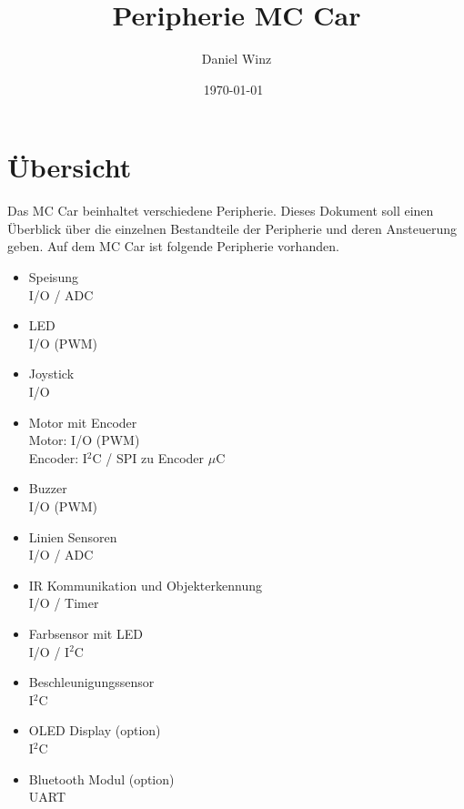 \documentclass[a4paper,10pt,fleqn]{article}
\title{Peripherie MC Car}
\author{Daniel Winz}
\date{\today~\dtc}
\begin{document}
\maketitle

\newpage

\tableofcontents

\newpage

\section{Übersicht}
Das MC Car beinhaltet verschiedene Peripherie. Dieses Dokument soll einen 
Überblick über die einzelnen Bestandteile der Peripherie und deren Ansteuerung 
geben. Auf dem MC Car ist folgende Peripherie vorhanden. 
\begin{itemize}
  \item Speisung \\
        I/O / ADC
  \item LED \\
        I/O (PWM)
  \item Joystick \\
        I/O
  \item Motor mit Encoder \\
        Motor: I/O (PWM) \\
        Encoder: I$^2$C / SPI zu Encoder $\mu$C
  \item Buzzer \\
        I/O (PWM)
  \item Linien Sensoren \\
        I/O / ADC
  \item IR Kommunikation und Objekterkennung \\
        I/O / Timer
  \item Farbsensor mit LED \\
        I/O / I$^2$C
  \item Beschleunigungssensor \\
        I$^2$C
  \item OLED Display (option) \\
        I$^2$C
  \item Bluetooth Modul (option) \\
        UART
\end{itemize}
\end{document}
